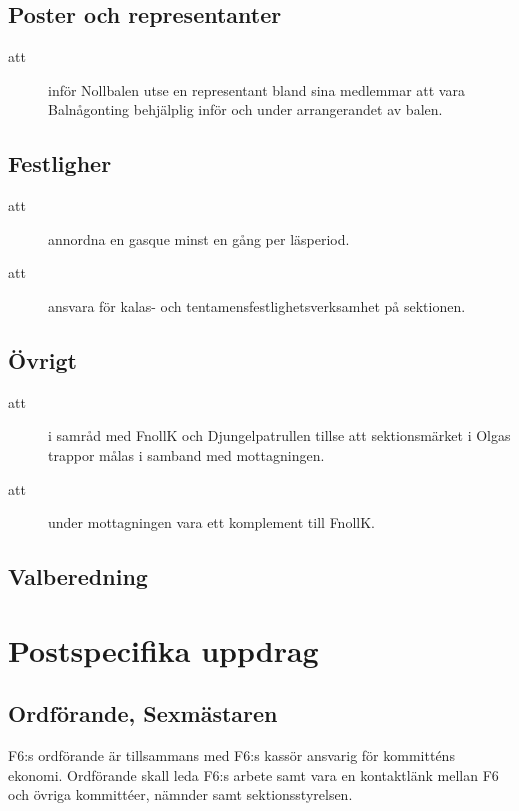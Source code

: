 \documentclass[a4paper]{article}
\begin{document}
\begin{foreningenv}{\forening{}}
    \subsection{Poster och representanter}
    \begin{description}
        \item[att] inför Nollbalen utse en representant bland sina medlemmar att vara Balnågonting behjälplig inför och under arrangerandet av balen.
    \end{description}
    
    \subsection{Festligher}
    \begin{description}
        \item[att] annordna en gasque minst en gång per läsperiod.
        \item[att] ansvara för kalas- och tentamensfestlighetsverksamhet på sektionen.
    \end{description}
    
    \subsection{Övrigt}
    \begin{description}
        \item[att] i samråd med FnollK och Djungelpatrullen tillse att sektionsmärket i Olgas trappor målas i samband med mottagningen.
        \item[att] under mottagningen vara ett komplement till FnollK.
    \end{description}
    
    \subsection{Valberedning}
    \aliggvalber{}
    
    \section{Postspecifika uppdrag}
    \subsection{Ordförande, Sexmästaren}
    F6:s ordförande är tillsammans med F6:s kassör ansvarig för kommitténs ekonomi. Ordförande skall leda F6:s arbete samt vara en kontaktlänk mellan F6 och övriga kommittéer, nämnder samt sektionsstyrelsen. 
    

\end{foreningenv}
\end{document}
